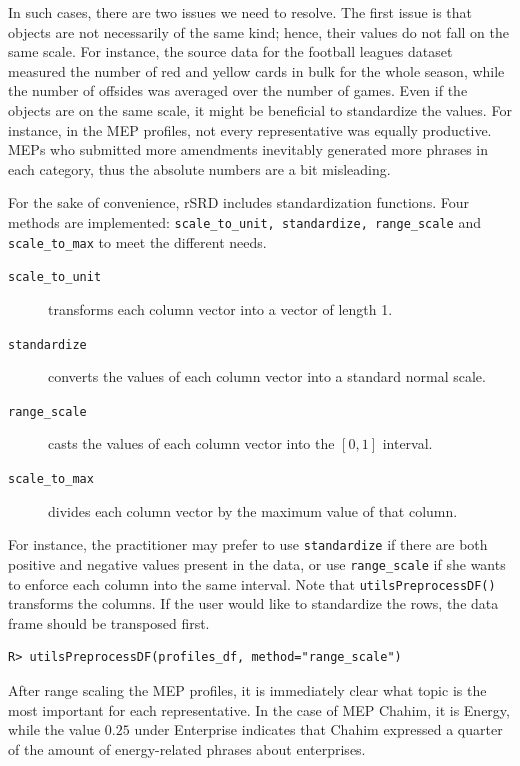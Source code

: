 In such cases, there are two issues we need to resolve. The first issue is that objects are not necessarily of the same kind; hence, their values do not fall on the same scale. For instance, the source data for the football leagues dataset measured the number of red and yellow cards in bulk for the whole season, while the number of offsides was averaged over the number of games. Even if the objects are on the same scale, it might be beneficial to standardize the values. For instance, in the MEP profiles, not every representative was equally productive. MEPs who submitted more amendments inevitably generated more phrases in each category, thus the absolute numbers are a bit misleading.

For the sake of convenience, rSRD includes standardization functions. Four methods are implemented: \texttt{scale\_to\_unit, standardize, range\_scale} and \texttt{scale\_to\_max} to meet the different needs.

\begin{description}
    \item [\texttt{scale\_to\_unit}] transforms each column vector into a vector of length 1.
    \item [\texttt{standardize}] converts the values of each column vector into a standard normal scale.
    \item [\texttt{range\_scale}] casts the values of each column vector into the $[0,1]$ interval.
    \item [\texttt{scale\_to\_max}] divides each column vector by the maximum value of that column.
\end{description}

For instance, the practitioner may prefer to use \texttt{standardize} if there are both positive and negative values present in the data, or use \texttt{range\_scale} if she wants to enforce each column into the same interval. Note that \texttt{utilsPreprocessDF()} transforms the columns. If the user would like to standardize the rows, the data frame should be transposed first.

\begin{verbatim}
R> utilsPreprocessDF(profiles_df, method="range_scale")
\end{verbatim}

After range scaling the MEP profiles, it is immediately clear what topic is the most important for each representative. In the case of MEP Chahim, it is Energy, while the value $0.25$ under Enterprise indicates that Chahim expressed a quarter of the amount of energy-related phrases about enterprises.

